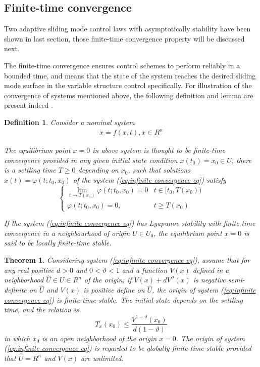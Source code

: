 \documentclass[3p]{elsarticle}
\theoremstyle{plain}
\newtheorem{mydef}{Definition}
\newtheorem{thm}{Theorem}
\begin{document}
\subsection{Finite-time convergence}
Two adaptive sliding mode control laws with asymptotically stability have been shown in last section, those finite-time convergence property will be discussed next.\par
The finite-time convergence ensures control schemes to perform reliably in a bounded time, and means that the state of the system reaches the desired sliding mode surface in the variable structure control specifically. For illustration of the convergence of systems mentioned above, the following definition and lemma are present indeed \cite{Zhang2012Finite}.
\begin{mydef}
Consider a nominal system
\begin{align}
\dot x = f(x,t),x\in R^n\label{eq:infinite convergence eq}
\end{align}\par
The equilibrium point $x=0$ in above system is thought to be finite-time convergence provided in any given initial state condition $x(t_0)=x_0\in U$, there is a settling time $T\ge 0$ depending on $x_0$, such that solutions $x(t) = \varphi(t;t_0,x_0)$ of the system (\ref{eq:infinite convergence eq}) satisfy
\begin{equation*}
\begin{cases}
\lim\limits_{t\rightarrow T(x_0)}\varphi(t;t_0,x_0)=0 &t\in[t_0,T(x_0))\\
\varphi(t;t_0,x_0)=0,&t\ge T(x_0)
\end{cases}
\end{equation*}\par
If the system (\ref{eq:infinite convergence eq}) has Lyapunov stability with finite-time convergence in a neighbourhood of origin $U\in U_0$, the equilibrium point $x=0$ is said to be locally finite-time stable.
\end{mydef}
\begin{thm}\label{lem:1}
Considering system (\ref{eq:infinite convergence eq}), assume that for any real positive $d>0$ and $0<\vartheta<1$ and a function $V(x)$ defined in a neighborhood $\hat U\in U \in R^n$ of the origin, if $\dot{V}(x)+dV^{\vartheta}(x)$ is negative semi-definite on $\hat{U}$ and $V(x)$ is positive define on $\hat{U}$, the origin of system (\ref{eq:infinite convergence eq}) is finite-time stable. The initial state depends on the settling time, and the relation is
\begin{equation}
T_x(x_0)\le\frac{V^{1-\vartheta}(x_0)}{d(1-\vartheta)}
\end{equation}
in which $x_0$ is an open neighborhood of the origin $x=0$. The origin of system (\ref{eq:infinite convergence eq}) is regarded to be globally finite-time stable provided that $\hat{U}=R^n$ and $V(x)$ are unlimited.
\end{thm}
\end{document}
